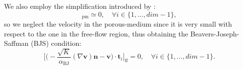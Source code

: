 \begin{itemize}
	We also employ the simplification introduced by \textcite{inter:bjs}:
	\begin{equation}
		[\mathbf{v} \cdot \mathbf{t}_i]_\text{pm} \simeq 0, \quad \forall i \in 
		\{1, 
		\dots, dim-1\},
	\end{equation}
	so we neglect the velocity in the porous-medium since it is very small with 
	respect to the one in the free-flow region, thus obtaining the 
	Beavers-Joseph-Saffman (BJS) condition:
	\begin{equation} \label{eq:bjs}
		\bigg[ \bigg( -\frac{\sqrt{K}}{\alpha_\text{BJ}} (\nabla \mathbf{v}) 
		\mathbf{n} - \mathbf{v} \bigg) \cdot \mathbf{t}_i \bigg]_\text{ff} = 0, 
		\quad \forall i \in \{1, \dots, dim - 1\}.
	\end{equation}
\end{itemize} 